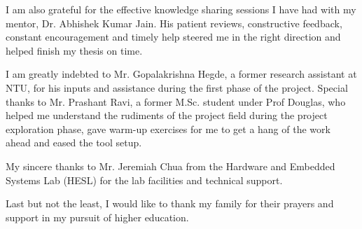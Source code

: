 I am also grateful for the effective knowledge sharing sessions I have had with my mentor, Dr. Abhishek Kumar Jain. His patient reviews, constructive feedback, constant encouragement and timely help steered me in the right direction and helped finish my thesis on time.\newline 

I am greatly indebted to Mr. Gopalakrishna Hegde, a former research assistant at NTU, for his inputs and assistance during the first phase of the project. Special thanks to Mr. Prashant Ravi, a former M.Sc. student under Prof Douglas, who helped me understand the rudiments of the project field during the project exploration phase, gave warm-up exercises for me to get a hang of the work ahead and eased the tool setup.\newline 

My sincere thanks to Mr. Jeremiah Chua from the Hardware and Embedded Systems Lab (HESL) for the lab facilities and technical support.\newline 

Last but not the least, I would like to thank my family for their prayers and support in my pursuit of higher education. 